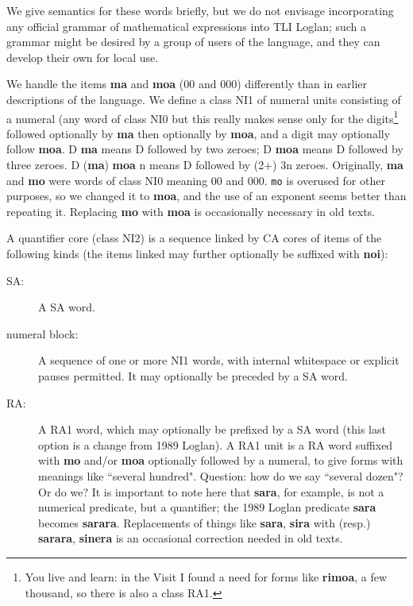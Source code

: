 \documentclass[12pt]{book}
\begin{document}
We give semantics for these words briefly, but we do not envisage incorporating any official grammar of mathematical expressions into TLI Loglan; such a grammar might be desired by a group of users of the language, and they can develop their own for local use.

We handle the items {\bf ma} and {\bf moa} (00 and 000) differently than in earlier descriptions of the language.  We define a class NI1 of numeral units consisting of a numeral (any word of class NI0 but this really makes
sense only for the digits\footnote{You live and learn:  in the Visit I found a need for forms like {\bf rimoa}, a few thousand, so there is also a class RA1.} followed optionally by {\bf ma} then optionally by {\bf moa}, and a digit may optionally follow {\bf moa}.   D {\bf ma} means D followed by two zeroes;  D {\bf moa} means D followed
by three zeroes.   D ({\bf ma}) {\bf moa} n means D followed by (2+) 3n zeroes.   Originally, {\bf ma} and {\bf mo} were words of class NI0 meaning 00 and 000.   {\tt mo} is overused for other purposes, so we changed it to {\bf moa}, and the use of an exponent seems better than repeating it.   Replacing {\bf mo} with {\bf moa} is occasionally necessary in old texts.

A quantifier core (class NI2) is a sequence linked by CA cores of items of the following kinds (the items linked may further optionally be suffixed with {\bf noi}):

\begin{description}

\item[SA:]  A SA word.

\item[numeral block:]  A sequence of one or more NI1 words, with internal whitespace or explicit pauses permitted.  It may optionally be preceded by a SA word.

\item[RA:]  A RA1 word, which may optionally be prefixed by a SA word (this last option is a change from 1989 Loglan).  A RA1 unit is a RA word suffixed
with {\bf mo} and/or {\bf moa} optionally followed by a numeral, to give forms with meanings like ``several hundred".    Question:  how do we say ``several dozen"?  Or do we?  It is important to note here that {\bf sara}, for example, is not a numerical predicate, but a quantifier;  the 1989 Loglan predicate {\bf sara} becomes {\bf sarara}.  Replacements of things like {\bf sara}, {\bf sira} with (resp.) {\bf sarara}, {\bf sinera} is an occasional correction needed in old texts.

\end{description}
\end{document}
